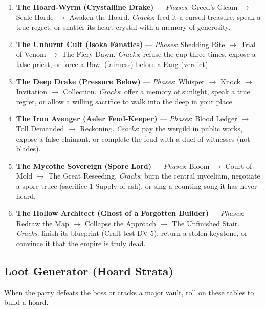 \begin{enumerate}
    \item \textbf{The Hoard-Wyrm (Crystalline Drake)} --- \emph{Phases}: Greed's Gleam $\rightarrow$ Scale Horde $\rightarrow$ Awaken the Hoard.
    \hfill \emph{Cracks}: feed it a cursed treasure, speak a true regret, or shatter its heart-crystal with a memory of generosity.
    \item \textbf{The Unburnt Cult (Isoka Fanatics)} --- \emph{Phases}: Shedding Rite $\rightarrow$ Trial of Venom $\rightarrow$ The Fiery Dawn.
    \hfill \emph{Cracks}: refuse the cup three times, expose a false priest, or force a Bowl (fairness) before a Fang (verdict).
    \item \textbf{The Deep Drake (Pressure Below)} --- \emph{Phases}: Whisper $\rightarrow$ Knock $\rightarrow$ Invitation $\rightarrow$ Collection.
    \hfill \emph{Cracks}: offer a memory of sunlight, speak a true regret, or allow a willing sacrifice to walk into the deep in your place.
    \item \textbf{The Iron Avenger (Aeler Feud-Keeper)} --- \emph{Phases}: Blood Ledger $\rightarrow$ Toll Demanded $\rightarrow$ Reckoning.
    \hfill \emph{Cracks}: pay the wergild in public works, expose a false claimant, or complete the feud with a duel of witnesses (not blades).
    \item \textbf{The Mycothe Sovereign (Spore Lord)} --- \emph{Phases}: Bloom $\rightarrow$ Court of Mold $\rightarrow$ The Great Reseeding.
    \hfill \emph{Cracks}: burn the central mycelium, negotiate a spore-truce (sacrifice 1 Supply of ash), or sing a counting song it has never heard.
    \item \textbf{The Hollow Architect (Ghost of a Forgotten Builder)} --- \emph{Phases}: Redraw the Map $\rightarrow$ Collapse the Approach $\rightarrow$ The Unfinished Stair.
    \hfill \emph{Cracks}: finish its blueprint (Craft test DV 5), return a stolen keystone, or convince it that the empire is truly dead.
\end{enumerate}

\subsection*{Loot Generator (Hoard Strata)}
When the party defeats the boss or cracks a major vault, roll on these tables to build a hoard.

